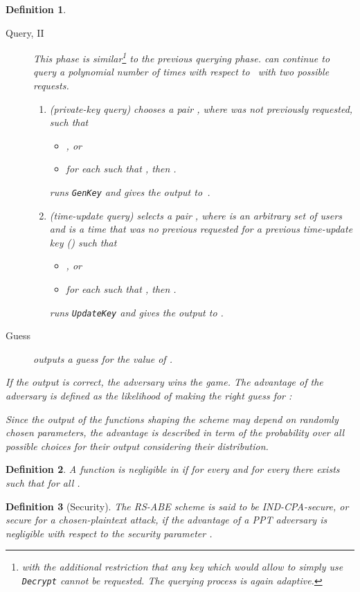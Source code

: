 \documentclass[a4paper,10pt]{article}
\newtheorem{definition}{Definition}
\newcommand{\singlefunction}[1]{\texttt{#1}}
\begin{document}
\begin{definition}
\begin{description}
			\item[Query, II]
			This phase is similar\footnote{with the additional restriction that any key which would allow  to simply use \singlefunction{Decrypt} cannot be requested. The querying process is again adaptive.} to the previous querying phase.			
			 can continue to query  a polynomial number of times with respect to~ with two possible requests.
			\begin{enumerate}
				\item
				(private-key query)
				 chooses a pair , where    was not previously requested, such that 
				\begin{itemize}
				\item , or
				\item for each  such that , then .
				\end{itemize}
				 runs \singlefunction{GenKey} and gives the output  to~.
				
				\item
				(time-update query)
				 selects a pair , where  is an arbitrary set of users and  is a time that was no previous requested for a previous time-update key () such that
				\begin{itemize} 
				\item , or
				\item for each  such that , then .
				\end{itemize}
				 runs \singlefunction{UpdateKey} and gives the output    to .
			\end{enumerate}
			
			
			\item[Guess]
			 outputs a guess  for the value of .
		\end{description}
		If the output is correct, the adversary wins the game.		
		The \emph{advantage} of the adversary  is defined as the likelihood of making the right guess for :
		
		Since the output of the functions shaping the scheme may depend on randomly chosen parameters, the advantage is described in term of the probability over all possible choices for their output considering their distribution.
	\end{definition}	
	\begin{definition}
 		A function  is \emph{negligible} in  if for every  and for every  there exists  such that  for all .
 	\end{definition}
	\begin{definition}[Security]
		The RS-ABE scheme is said to be \emph{IND-CPA-secure}, or \emph{secure for a chosen-plaintext attack}, if the advantage of a PPT adversary is negligible with respect to the security parameter .
	\end{definition}
	
\end{document}
